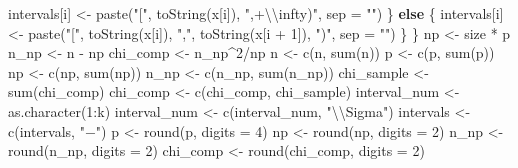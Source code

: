 \documentclass[
]{article}
\newenvironment{Shaded}{\begin{snugshade}}{\end{snugshade}}
\newcommand{\AttributeTok}[1]{\textcolor[rgb]{0.77,0.63,0.00}{#1}}
\newcommand{\ControlFlowTok}[1]{\textcolor[rgb]{0.13,0.29,0.53}{\textbf{#1}}}
\newcommand{\DecValTok}[1]{\textcolor[rgb]{0.00,0.00,0.81}{#1}}
\newcommand{\FunctionTok}[1]{\textcolor[rgb]{0.00,0.00,0.00}{#1}}
\newcommand{\NormalTok}[1]{#1}
\newcommand{\OtherTok}[1]{\textcolor[rgb]{0.56,0.35,0.01}{#1}}
\newcommand{\SpecialCharTok}[1]{\textcolor[rgb]{0.00,0.00,0.00}{#1}}
\newcommand{\StringTok}[1]{\textcolor[rgb]{0.31,0.60,0.02}{#1}}
\begin{document}
\begin{Shaded}
\begin{Highlighting}[]
\NormalTok{        intervals[i] }\OtherTok{\textless{}{-}} \FunctionTok{paste}\NormalTok{(}\StringTok{"["}\NormalTok{, }\FunctionTok{toString}\NormalTok{(x[i]), }\StringTok{",+}\SpecialCharTok{\textbackslash{}\textbackslash{}}\StringTok{infty)"}\NormalTok{, }\AttributeTok{sep =} \StringTok{""}\NormalTok{)}
\NormalTok{    \} }\ControlFlowTok{else}\NormalTok{ \{}
\NormalTok{        intervals[i] }\OtherTok{\textless{}{-}} \FunctionTok{paste}\NormalTok{(}\StringTok{"["}\NormalTok{, }\FunctionTok{toString}\NormalTok{(x[i]), }\StringTok{","}\NormalTok{, }\FunctionTok{toString}\NormalTok{(x[i }\SpecialCharTok{+} \DecValTok{1}\NormalTok{]), }\StringTok{")"}\NormalTok{, }
            \AttributeTok{sep =} \StringTok{""}\NormalTok{)}
\NormalTok{    \}}
\NormalTok{\}}
\NormalTok{np }\OtherTok{\textless{}{-}}\NormalTok{ size }\SpecialCharTok{*}\NormalTok{ p}
\NormalTok{n\_np }\OtherTok{\textless{}{-}}\NormalTok{ n }\SpecialCharTok{{-}}\NormalTok{ np}
\NormalTok{chi\_comp }\OtherTok{\textless{}{-}}\NormalTok{ n\_np}\SpecialCharTok{\^{}}\DecValTok{2}\SpecialCharTok{/}\NormalTok{np}
\NormalTok{n }\OtherTok{\textless{}{-}} \FunctionTok{c}\NormalTok{(n, }\FunctionTok{sum}\NormalTok{(n))}
\NormalTok{p }\OtherTok{\textless{}{-}} \FunctionTok{c}\NormalTok{(p, }\FunctionTok{sum}\NormalTok{(p))}
\NormalTok{np }\OtherTok{\textless{}{-}} \FunctionTok{c}\NormalTok{(np, }\FunctionTok{sum}\NormalTok{(np))}
\NormalTok{n\_np }\OtherTok{\textless{}{-}} \FunctionTok{c}\NormalTok{(n\_np, }\FunctionTok{sum}\NormalTok{(n\_np))}
\NormalTok{chi\_sample }\OtherTok{\textless{}{-}} \FunctionTok{sum}\NormalTok{(chi\_comp)}
\NormalTok{chi\_comp }\OtherTok{\textless{}{-}} \FunctionTok{c}\NormalTok{(chi\_comp, chi\_sample)}
\NormalTok{interval\_num }\OtherTok{\textless{}{-}} \FunctionTok{as.character}\NormalTok{(}\DecValTok{1}\SpecialCharTok{:}\NormalTok{k)}
\NormalTok{interval\_num }\OtherTok{\textless{}{-}} \FunctionTok{c}\NormalTok{(interval\_num, }\StringTok{"}\SpecialCharTok{\textbackslash{}\textbackslash{}}\StringTok{Sigma"}\NormalTok{)}
\NormalTok{intervals }\OtherTok{\textless{}{-}} \FunctionTok{c}\NormalTok{(intervals, }\StringTok{"${-}$"}\NormalTok{)}
\NormalTok{p }\OtherTok{\textless{}{-}} \FunctionTok{round}\NormalTok{(p, }\AttributeTok{digits =} \DecValTok{4}\NormalTok{)}
\NormalTok{np }\OtherTok{\textless{}{-}} \FunctionTok{round}\NormalTok{(np, }\AttributeTok{digits =} \DecValTok{2}\NormalTok{)}
\NormalTok{n\_np }\OtherTok{\textless{}{-}} \FunctionTok{round}\NormalTok{(n\_np, }\AttributeTok{digits =} \DecValTok{2}\NormalTok{)}
\NormalTok{chi\_comp }\OtherTok{\textless{}{-}} \FunctionTok{round}\NormalTok{(chi\_comp, }\AttributeTok{digits =} \DecValTok{2}\NormalTok{)}

\end{Highlighting}
\end{Shaded}
\end{document}
